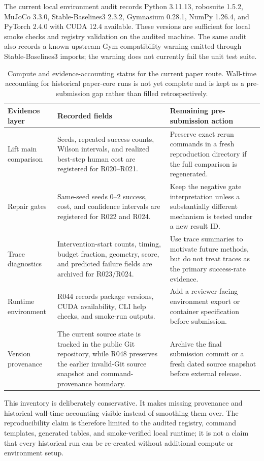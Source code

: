 The current local environment audit records Python 3.11.13, robosuite 1.5.2, MuJoCo 3.3.0, Stable-Baselines3 2.3.2, Gymnasium 0.28.1, NumPy 1.26.4, and PyTorch 2.4.0 with CUDA 12.4 available. These versions are sufficient for local smoke checks and registry validation on the audited machine. The same audit also records a known upstream Gym compatibility warning emitted through Stable-Baselines3 imports; the warning does not currently fail the unit test suite.

\begin{table}[t]
\centering
\caption{Compute and evidence-accounting status for the current paper route. Wall-time accounting for historical paper-core runs is not yet complete and is kept as a pre-submission gap rather than filled retrospectively.}
\label{tab:compute_accounting_status}
\small
\begin{tabular}{p{}p{}p{}}
\toprule
\textbf{Evidence layer} & \textbf{Recorded fields} & \textbf{Remaining pre-submission action} \\
\midrule
Lift main comparison & Seeds, repeated success counts, Wilson intervals, and realized best-step human cost are registered for R020--R021. & Preserve exact rerun commands in a fresh reproduction directory if the full comparison is regenerated. \\
Repair gates & Same-seed seeds 0--2 success, cost, and confidence intervals are registered for R022 and R024. & Keep the negative gate interpretation unless a substantially different mechanism is tested under a new result ID. \\
Trace diagnostics & Intervention-start counts, timing, budget fraction, geometry, score, and predicted failure fields are archived for R023/R024. & Use trace summaries to motivate future methods, but do not treat traces as the primary success-rate evidence. \\
Runtime environment & R044 records package versions, CUDA availability, CLI help checks, and smoke-run outputs. & Add a reviewer-facing environment export or container specification before submission. \\
Version provenance & The current source state is tracked in the public Git repository, while R048 preserves the earlier invalid-Git source snapshot and command-provenance boundary. & Archive the final submission commit or a fresh dated source snapshot before external release. \\
\bottomrule
\end{tabular}
\end{table}

This inventory is deliberately conservative. It makes missing provenance and historical wall-time accounting visible instead of smoothing them over. The reproducibility claim is therefore limited to the audited registry, command templates, generated tables, and smoke-verified local runtime; it is not a claim that every historical run can be re-created without additional compute or environment setup.
